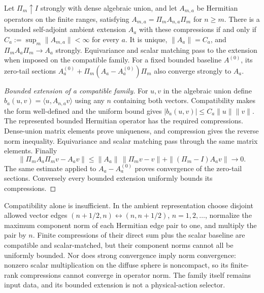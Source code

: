 \documentclass[12pt,a4paper]{article}
\begin{document}
\begin{proposition}
\label{p2c:prop:compatible-bounded-ambient-extension}
Let $\Pi_m\uparrow I$ strongly with dense algebraic union, and let
$A_{m,a}$ be Hermitian operators on the finite ranges, satisfying
$A_{m,a}=\Pi_mA_{n,a}\Pi_m$ for $n\ge m$.
There is a bounded self-adjoint ambient extension $A_a$ with these
compressions if and only if $C_a:=\sup_m\|A_{m,a}\|<\infty$ for every $a$.
It is unique, $\|A_a\|=C_a$, and $\Pi_mA_a\Pi_m\to A_a$ strongly.
Equivariance and scalar matching pass to the extension when imposed on
the compatible family. For a fixed bounded baseline $A^{(0)}$, its zero-tail
sections $A_a^{(0)}+\Pi_m(A_a-A_a^{(0)})\Pi_m$ also converge strongly to $A_a$.
\end{proposition}
\begin{proof}[Bounded extension of a compatible family]
For $u,v$ in the algebraic union define
$b_a(u,v)=\langle u,A_{n,a}v\rangle$ using any $n$ containing both vectors.
Compatibility makes the form well-defined and the uniform bound gives
$|b_a(u,v)|\le C_a\|u\|\|v\|$.
The represented bounded Hermitian operator has the required compressions.
Dense-union matrix elements prove uniqueness, and compression gives the
reverse norm inequality. Equivariance and scalar matching pass through the
same matrix elements. Finally
\[
 \|\Pi_mA_a\Pi_mv-A_av\|
 \le \|A_a\|\,\|\Pi_mv-v\|
       +\|(\Pi_m-I)A_av\|\longrightarrow0.
\]
The same estimate applied to $A_a-A_a^{(0)}$ proves convergence of the
zero-tail sections. Conversely every bounded extension uniformly bounds
its compressions.
\end{proof}

\begin{remark}
Compatibility alone is insufficient. In the ambient representation choose
disjoint allowed vector edges $(n+1/2,n)\leftrightarrow(n,n+1/2)$,
$n=1,2,\ldots$, normalize the maximum component norm of each Hermitian edge
pair to one, and multiply the pair by $n$. Finite compressions of their
direct sum plus the scalar baseline are compatible and scalar-matched,
but their component norms cannot all be uniformly bounded.
Nor does strong convergence imply norm convergence: nonzero scalar
multiplication on the diffuse sphere is noncompact, so its finite-rank
compressions cannot converge in operator norm. The family itself remains
input data, and its bounded extension is not a physical-action selector.
\end{remark}
\end{document}
